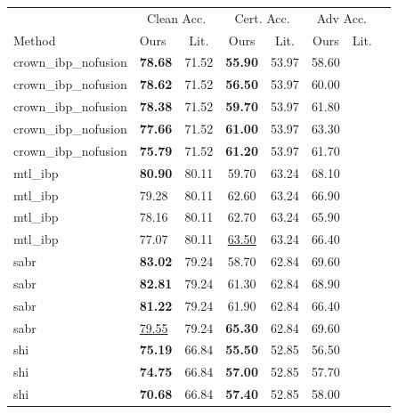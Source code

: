 \begin{tabular}{llcccccc}
\toprule
 & \multicolumn{2}{c}{Clean Acc.} & \multicolumn{2}{c}{Cert. Acc.} & \multicolumn{2}{c}{Adv Acc.} \\
Method & Ours & Lit. & Ours & Lit. & Ours & Lit. \\
\midrule
crown\_ibp\_nofusion & \textbf{78.68} & 71.52 & \textbf{55.90} & 53.97 & 58.60 & \\
crown\_ibp\_nofusion & \textbf{78.62} & 71.52 & \textbf{56.50} & 53.97 & 60.00 & \\
crown\_ibp\_nofusion & \textbf{78.38} & 71.52 & \textbf{59.70} & 53.97 & 61.80 & \\
crown\_ibp\_nofusion & \textbf{77.66} & 71.52 & \textbf{61.00} & 53.97 & 63.30 & \\
crown\_ibp\_nofusion & \textbf{75.79} & 71.52 & \textbf{61.20} & 53.97 & 61.70 & \\
mtl\_ibp & \textbf{80.90} & 80.11 & 59.70 & 63.24 & 68.10 & \\
mtl\_ibp & 79.28 & 80.11 & 62.60 & 63.24 & 66.90 & \\
mtl\_ibp & 78.16 & 80.11 & 62.70 & 63.24 & 65.90 & \\
mtl\_ibp & 77.07 & 80.11 & \underline{63.50} & 63.24 & 66.40 & \\
sabr & \textbf{83.02} & 79.24 & 58.70 & 62.84 & 69.60 & \\
sabr & \textbf{82.81} & 79.24 & 61.30 & 62.84 & 68.90 & \\
sabr & \textbf{81.22} & 79.24 & 61.90 & 62.84 & 66.40 & \\
sabr & \underline{79.55} & 79.24 & \textbf{65.30} & 62.84 & 69.60 & \\
shi & \textbf{75.19} & 66.84 & \textbf{55.50} & 52.85 & 56.50 & \\
shi & \textbf{74.75} & 66.84 & \textbf{57.00} & 52.85 & 57.70 & \\
shi & \textbf{70.68} & 66.84 & \textbf{57.40} & 52.85 & 58.00 & \\
\bottomrule
\end{tabular}